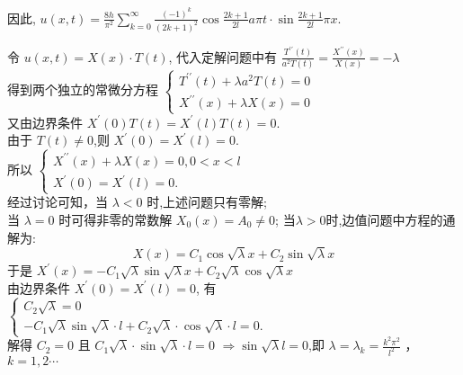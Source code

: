 \begin{questions}
\begin{solution}
因此, $ u(x, t)=\frac{8 h}{\pi^{2}} \sum\limits_{k=0}^{\infty} \frac{(-1)^{k}}{(2 k+1)^{2}} \cos \frac{2 k+1}{2 l} a \pi t \cdot \sin \frac{2 k+1}{2 l} \pi x$.
\end{solution}


\begin{solution}
令 $ u(x, t)=X(x) \cdot T(t) $, 代入定解问题中有
$
\frac{T^{\prime \prime}(t)}{a^{2} T(t)}=\frac{X^{\prime \prime}(x)}{X(x)}=-\lambda
$\\
得到两个独立的常微分方程 $ \left\{\begin{array}{l}T^{\prime \prime}(t)+\lambda a^{2} T(t)=0 \\ X^{\prime \prime}(x)+\lambda X(x)=0\end{array}\right. $\\
又由边界条件 
$ X^{\prime}(0) T(t)=X^{\prime}(l) T(t)=0 .$\\
由于 $ T(t) \neq 0 $,则 
$X^{\prime}(0)=X^{\prime}(l)=0.$\\
所以 $ \left\{\begin{array}{l}X^{\prime \prime}(x)+\lambda X(x)=0,0< x < l \\ X^{\prime}(0)=X^{\prime}(l)=0 .\end{array}\right. $\\
经过讨论可知，当 $ \lambda<0 $ 时,上述问题只有零解;\\
当 $ \lambda=0 $ 时可得非零的常数解 $ X_{0}(x)=A_0\neq 0 $;
当$\lambda > 0$时,边值问题中方程的通解为:
$$
X(x)=C_{1} \cos \sqrt{\lambda} x+C_{2} \sin \sqrt{\lambda} x
$$
于是 $ X^{\prime}(x)=-C_{1} \sqrt{\lambda} \sin \sqrt{\lambda} x+C_{2} \sqrt{\lambda} \cos \sqrt{\lambda} x $\\
由边界条件 $ X^{\prime}(0)=X^{\prime}(l)=0 $,
有 $ \left\{\begin{array}{l}C_{2} \sqrt{\lambda}=0 \\ -C_{1} \sqrt{\lambda} \sin \sqrt{\lambda} \cdot l+C_{2} \sqrt{\lambda} \cdot \cos \sqrt{\lambda} \cdot l=0 .\end{array}\right. $\\
解得 $ C_{2}=0 $ 且 $ C_{1} \sqrt{\lambda} \cdot \sin \sqrt{\lambda} \cdot l=0 $
$ \Rightarrow \sin \sqrt{\lambda} l=0 $,即 $ \lambda=\lambda_{k}=\frac{k^{2} \pi^{2}}{l^{2}}$ ， $k=1,2 \cdots $\\

\end{solution}
\end{questions}
